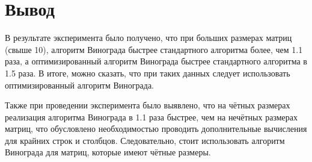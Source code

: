 \section{Вывод}
В результате эксперимента было получено, что при больших размерах матриц (свыше 10), алгоритм Винограда быстрее стандартного алгоритма более, чем 1.1 раза, а оптимизированный алгоритм Винограда быстрее стандартного алгоритма в 1.5 раза. В итоге, можно сказать, что при таких данных следует использовать оптимизированный алгоритм Винограда. 

Также при проведении эксперимента было выявлено, что на чётных размерах реализация алгоритма Винограда в 1.1 раза быстрее, чем на нечётных размерах матриц, что обусловлено необходимостью проводить дополнительные вычисления для крайних строк и столбцов. Следовательно, стоит использовать алгоритм Винограда для матриц, которые имеют чётные размеры.
